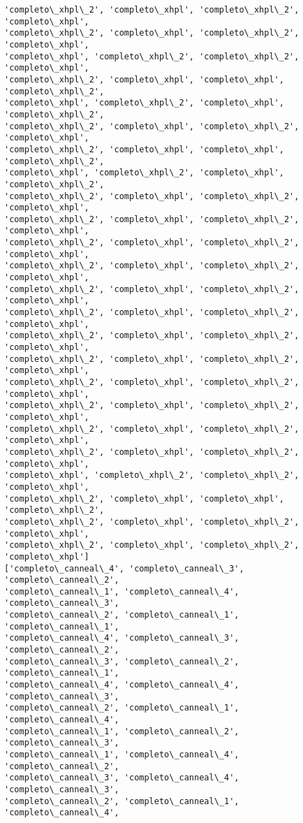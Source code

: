 \documentclass[11pt]{article}
\begin{document}
\begin{Verbatim}[commandchars=\\\{\}]
'completo\_xhpl\_2', 'completo\_xhpl', 'completo\_xhpl\_2', 'completo\_xhpl',
'completo\_xhpl\_2', 'completo\_xhpl', 'completo\_xhpl\_2', 'completo\_xhpl',
'completo\_xhpl', 'completo\_xhpl\_2', 'completo\_xhpl\_2', 'completo\_xhpl',
'completo\_xhpl\_2', 'completo\_xhpl', 'completo\_xhpl', 'completo\_xhpl\_2',
'completo\_xhpl', 'completo\_xhpl\_2', 'completo\_xhpl', 'completo\_xhpl\_2',
'completo\_xhpl\_2', 'completo\_xhpl', 'completo\_xhpl\_2', 'completo\_xhpl',
'completo\_xhpl\_2', 'completo\_xhpl', 'completo\_xhpl', 'completo\_xhpl\_2',
'completo\_xhpl', 'completo\_xhpl\_2', 'completo\_xhpl', 'completo\_xhpl\_2',
'completo\_xhpl\_2', 'completo\_xhpl', 'completo\_xhpl\_2', 'completo\_xhpl',
'completo\_xhpl\_2', 'completo\_xhpl', 'completo\_xhpl\_2', 'completo\_xhpl',
'completo\_xhpl\_2', 'completo\_xhpl', 'completo\_xhpl\_2', 'completo\_xhpl',
'completo\_xhpl\_2', 'completo\_xhpl', 'completo\_xhpl\_2', 'completo\_xhpl',
'completo\_xhpl\_2', 'completo\_xhpl', 'completo\_xhpl\_2', 'completo\_xhpl',
'completo\_xhpl\_2', 'completo\_xhpl', 'completo\_xhpl\_2', 'completo\_xhpl',
'completo\_xhpl\_2', 'completo\_xhpl', 'completo\_xhpl\_2', 'completo\_xhpl',
'completo\_xhpl\_2', 'completo\_xhpl', 'completo\_xhpl\_2', 'completo\_xhpl',
'completo\_xhpl\_2', 'completo\_xhpl', 'completo\_xhpl\_2', 'completo\_xhpl',
'completo\_xhpl\_2', 'completo\_xhpl', 'completo\_xhpl\_2', 'completo\_xhpl',
'completo\_xhpl\_2', 'completo\_xhpl', 'completo\_xhpl\_2', 'completo\_xhpl',
'completo\_xhpl\_2', 'completo\_xhpl', 'completo\_xhpl\_2', 'completo\_xhpl',
'completo\_xhpl', 'completo\_xhpl\_2', 'completo\_xhpl\_2', 'completo\_xhpl',
'completo\_xhpl\_2', 'completo\_xhpl', 'completo\_xhpl', 'completo\_xhpl\_2',
'completo\_xhpl\_2', 'completo\_xhpl', 'completo\_xhpl\_2', 'completo\_xhpl',
'completo\_xhpl\_2', 'completo\_xhpl', 'completo\_xhpl\_2', 'completo\_xhpl']
['completo\_canneal\_4', 'completo\_canneal\_3', 'completo\_canneal\_2',
'completo\_canneal\_1', 'completo\_canneal\_4', 'completo\_canneal\_3',
'completo\_canneal\_2', 'completo\_canneal\_1', 'completo\_canneal\_1',
'completo\_canneal\_4', 'completo\_canneal\_3', 'completo\_canneal\_2',
'completo\_canneal\_3', 'completo\_canneal\_2', 'completo\_canneal\_1',
'completo\_canneal\_4', 'completo\_canneal\_4', 'completo\_canneal\_3',
'completo\_canneal\_2', 'completo\_canneal\_1', 'completo\_canneal\_4',
'completo\_canneal\_1', 'completo\_canneal\_2', 'completo\_canneal\_3',
'completo\_canneal\_1', 'completo\_canneal\_4', 'completo\_canneal\_2',
'completo\_canneal\_3', 'completo\_canneal\_4', 'completo\_canneal\_3',
'completo\_canneal\_2', 'completo\_canneal\_1', 'completo\_canneal\_4',

\end{Verbatim}
\end{document}
